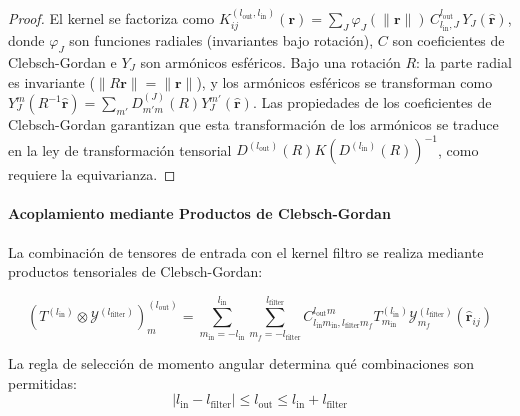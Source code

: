 \begin{proof}
El kernel se factoriza como $K_{ij}^{(l_{\text{out}}, l_{\text{in}})}(\mathbf{r}) = \sum_{J} \varphi_J(\|\mathbf{r}\|) \, C^{l_{\text{out}}}_{l_{\text{in}}, J} \, Y_J(\hat{\mathbf{r}})$, donde $\varphi_J$ son funciones radiales (invariantes bajo rotación), $C$ son coeficientes de Clebsch-Gordan e $Y_J$ son armónicos esféricos. Bajo una rotación $R$: la parte radial es invariante ($\|R\mathbf{r}\| = \|\mathbf{r}\|$), y los armónicos esféricos se transforman como $Y_J^m(R^{-1}\hat{\mathbf{r}}) = \sum_{m'} D_{m'm}^{(J)}(R) Y_J^{m'}(\hat{\mathbf{r}})$. Las propiedades de los coeficientes de Clebsch-Gordan garantizan que esta transformación de los armónicos se traduce en la ley de transformación tensorial $D^{(l_{\text{out}})}(R) K (D^{(l_{\text{in}})}(R))^{-1}$, como requiere la equivarianza.
\end{proof}

\paragraph{Acoplamiento mediante Productos de Clebsch-Gordan}

La combinación de tensores de entrada con el kernel filtro se realiza mediante productos tensoriales de Clebsch-Gordan:

\begin{equation}\label{eq:tfn_cg_coupling}
(T^{(l_{\text{in}})} \otimes \mathcal{Y}^{(l_{\text{filter}})})^{(l_{\text{out}})}_m = \sum_{m_{\text{in}}=-l_{\text{in}}}^{l_{\text{in}}} \sum_{m_f=-l_{\text{filter}}}^{l_{\text{filter}}} C_{l_{\text{in}} m_{\text{in}}, l_{\text{filter}} m_f}^{l_{\text{out}} m} T^{(l_{\text{in}})}_{m_{\text{in}}} \mathcal{Y}^{(l_{\text{filter}})}_{m_f}(\hat{\mathbf{r}}_{ij})
\end{equation}

La regla de selección de momento angular determina qué combinaciones son permitidas:
\begin{equation}
|l_{\text{in}} - l_{\text{filter}}| \leq l_{\text{out}} \leq l_{\text{in}} + l_{\text{filter}}
\end{equation}

